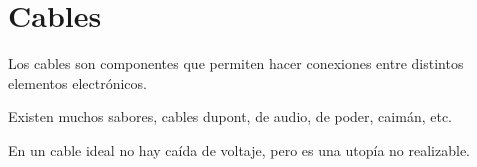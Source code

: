 \documentclass[../principal.tex]{subfiles}
\begin{document}
\chapter{Cables}

Los cables son componentes que permiten hacer conexiones entre distintos elementos electrónicos.

Existen muchos sabores, cables dupont, de audio, de poder, caimán, etc.

En un cable ideal no hay caída de voltaje, pero es una utopía no realizable.

\newpage
\end{document}
